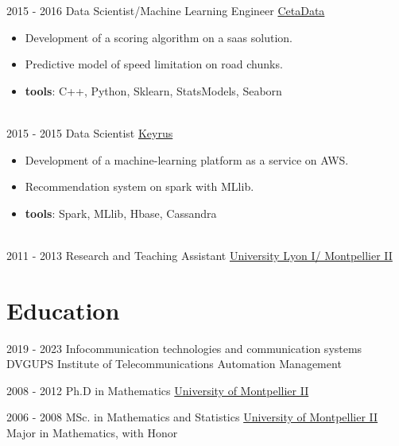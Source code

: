 \documentclass[letterpaper]{twentysecondcv} %
\begin{document}
\begin{twenty}
    \twentyitem
   		{2015 - 2016}
		{}
        {Data Scientist/Machine Learning Engineer}
        {\href{http://www.cetadata.com/}{CetaData}}
        {}
        {\vspace{-2mm}\begin{itemize}[topsep=0pt,partopsep=0pt]
				\item Development of a scoring algorithm on a saas solution.
        \item Predictive model of speed limitation on road chunks.
				\item \textbf{tools}: C++, Python, Sklearn, StatsModels, Seaborn
    \end{itemize}} \\
		
     \twentyitem
   		{2015 - 2015}
		{}
        {Data Scientist}
        {\href{http://www.keyrus.com/}{Keyrus}}
        {}
        {
        \vspace{-2mm}\begin{itemize}[topsep=0pt,partopsep=0pt]
        \item Development of a machine-learning platform as a service on AWS. 
				\item Recommendation system on spark with MLlib.
				\item \textbf{tools}: Spark, MLlib, Hbase, Cassandra
    \end{itemize} } \\
		
	\twentyitem
   		{2011 - 2013}
		{}
        {Research and Teaching Assistant}
        {\href{http://www.univ-lyon1.fr/}{University Lyon I/ Montpellier II}}
        {}
        {} 
        
\end{twenty}

\vspace{-0.25cm}
\section{Education}{\faGraduationCap}

\begin{twenty} %
	\twentyitemshorttest
    	{2019 - 2023}
        {}
        {Infocommunication technologies and communication systems}
        {DVGUPS}
        {Institute of Telecommunications Automation Management}
				
	\twentyitemshorttest
    	{2008 - 2012}
		{}
        {Ph.D in Mathematics}
        {\href{http://www.umontpellier.fr/}{University of Montpellier II}}
        {}
				
	\twentyitemshorttest
    	{2006 - 2008}
		{}
        {MSc. in Mathematics and Statistics}
        {\href{http://www.umontpellier.fr/}{University of Montpellier II}}
        {Major in Mathematics, with Honor}
\end{twenty}
\end{document}
